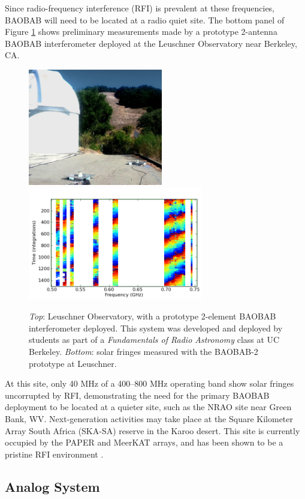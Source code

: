\documentclass[10pt,iop]{emulateapj}
\begin{document}
Since radio-frequency interference (RFI) is prevalent at these frequencies,
BAOBAB will need to be located at a radio quiet site.  The bottom
panel of Figure \ref{fig:leuschner} shows preliminary measurements made by a
prototype 2-antenna BAOBAB interferometer deployed at the Leuschner Observatory
near Berkeley, CA.  
\begin{figure}\centering
    \includegraphics[height=2.0in]{leuschner_deploy.jpg}
    \includegraphics[width=3.0in]{leuschner_fringes.png}
    \caption{\emph{Top}: Leuschner Observatory, with a prototype 2-element BAOBAB
interferometer deployed.  This system was developed and deployed by students as
part of a {\it Fundamentals of Radio Astronomy} class at UC Berkeley.  \emph{Bottom}:
solar fringes measured with the BAOBAB-2 prototype at Leuschner.
}
\label{fig:leuschner}
\end{figure}
At this site, only 40 MHz of a 400--800 MHz operating band
show solar fringes uncorrupted by RFI, demonstrating the need for the primary
BAOBAB deployment to be located 
at a quieter site, such as the NRAO site near Green Bank, WV.  
Next-generation activities may
take place at the Square Kilometer Array South Africa
(SKA-SA) reserve in the Karoo desert.  This site is currently
occupied by the PAPER and MeerKAT arrays, and has been shown to be a pristine RFI
environment \citep{jacobs_et_al_2011}.

\subsection{Analog System}
\end{document}
